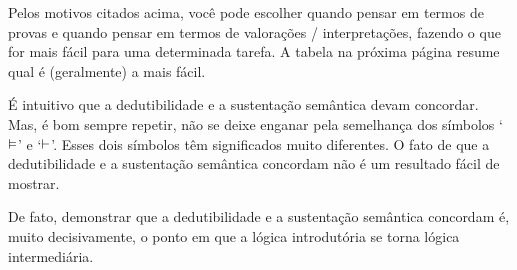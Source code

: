 Pelos  motivos citados acima, você pode escolher quando pensar em termos de provas e quando pensar em termos de valorações / interpretações, fazendo o que for mais fácil para uma determinada tarefa. A tabela na próxima página resume qual é (geralmente) a mais fácil.

É intuitivo que a dedutibilidade e a sustentação semântica devam concordar. Mas, é bom sempre repetir, não se deixe enganar pela semelhança dos símbolos `$\vDash$' e `$\vdash$'. Esses dois símbolos têm significados muito diferentes. O fato de que a dedutibilidade  e a sustentação semântica concordam não é um resultado fácil de mostrar. 

De fato, demonstrar que a dedutibilidade e a sustentação semântica concordam é, muito decisivamente, o ponto em que a lógica introdutória se torna lógica intermediária.


